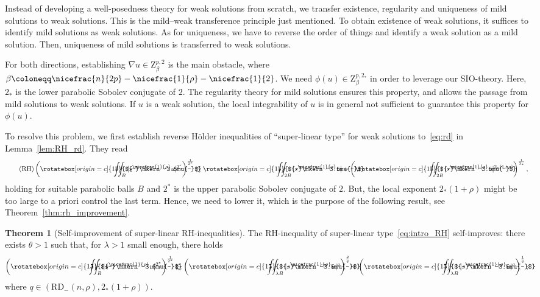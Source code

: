 \documentclass[11pt, leqno]{amsart}
\theoremstyle{definition}
\newtheorem*{theorem-nonum}{Theorem}
\newcommand{\Z}{\mathrm{Z}}
\newcommand{\RD}{\mathrm{RD}}
\def\Yint#1{\mathchoice
	{\YYint\displaystyle\textstyle{#1}}%
	{\YYint\textstyle\scriptstyle{#1}}%
	{\YYint\scriptstyle\scriptscriptstyle{#1}}%
	{\YYint\scriptscriptstyle\scriptscriptstyle{#1}}%
	\!\iint}
\def\YYint#1#2#3{{\setbox0=\hbox{$#1{#2#3}{\iint}$}
		\vcenter{\hbox{$#2#3$}}\kern-.51\wd0}}
\def\longdash{{-}\mkern-3.5mu{-}}
\def\tiltlongdash{\rotatebox[origin=c]{15}{$\longdash$}}
\def\tiltfiint{\Yint\longdash}
\def\tiltfiint{\Yint\tiltlongdash}
\begin{document}
	Instead of developing a well-posedness theory for weak solutions from scratch, we transfer existence, regularity and uniqueness of mild solutions to weak solutions. This is the mild--weak transference principle just mentioned. To obtain existence of weak solutions, it suffices to identify mild solutions as weak solutions. As for uniqueness, we have to reverse the order of things and identify a weak solution as a mild solution. Then, uniqueness of mild solutions is transferred to weak solutions.

	For both directions, establishing $\nabla u \in \Z^{p,2}_\beta$ is the main obstacle, where $\beta \coloneqq \nicefrac{n}{2p} - \nicefrac{1}{\rho} - \nicefrac{1}{2}$. We need $\phi(u) \in \Z^{p,2_*}_\beta$ in order to leverage our SIO-theory. Here, $2_*$ is the lower parabolic Sobolev conjugate of $2$. The regularity theory for mild solutions ensures this property, and allows the passage from mild solutions to weak solutions. If $u$ is a weak solution, the local integrability of $u$ is in general not sufficient to guarantee this property for $\phi(u)$.

	To resolve this problem, we first establish reverse Hölder inequalities of \enquote{super-linear type} for weak solutions to~\eqref{eq:rd} in Lemma~\ref{lem:RH_rd}. They read
	\begin{align}
		\label{eq:intro_RH}
		\tag{RH}
		\left( \tiltfiint_{B} |s^{\nicefrac{1}{\rho}} u|^{2^*} \right)^\frac{1}{2^*} \lesssim \tiltfiint_{2B} |s^{\nicefrac{1}{\rho}} u| + \left( \tiltfiint_{2B} |s^{\nicefrac{1}{\rho}} u|^{2_*(1+\rho)} \right)^\frac{1}{2_*},
	\end{align}
	holding for suitable parabolic balls $B$ and $2^*$ is the upper parabolic Sobolev conjugate of $2$.
	But, the local exponent $2_*(1+\rho)$ might be too large to a priori control the last term.
	Hence, we need to lower it, which is the purpose of the following result, see Theorem~\ref{thm:rh_improvement}.

	\begin{theorem-nonum}[Self-improvement of super-linear RH-inequalities]
		The RH-inequality of super-linear type~\eqref{eq:intro_RH} self-improves: there exists $\theta > 1$ such that, for $\lambda > 1$ small enough, there holds
		\begin{align}
			\left( \tiltfiint_{B} |s^{\nicefrac{1}{\rho}} u|^{2^*} \right)^\frac{1}{2^*} \lesssim \left( \tiltfiint_{\lambda B} |s^{\nicefrac{1}{\rho}} u|^{q} \right)^\frac{\theta}{q} + \left( \tiltfiint_{\lambda B} |s^{\nicefrac{1}{\rho}} u|^{q} \right)^\frac{1}{q},
		\end{align}
		where $q \in (\RD_{-}(n,\rho), 2_* (1+\rho))$.
	\end{theorem-nonum}
\end{document}
